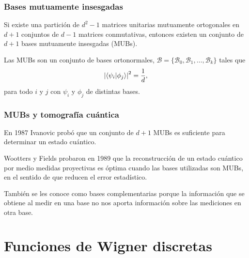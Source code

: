 \documentclass[10pt,spanish]{beamer}
\begin{document}
  \begin{frame}
    \frametitle{Bases mutuamente insesgadas}

    \begin{theorem}[Bandyophyay et al]
      Si existe una partición de $d^2-1$ matrices unitarias
      mutuamente ortogonales en $d+1$ conjuntos de $d-1$ 
      matrices conmutativas, entonces existen un conjunto de
      $d+1$ bases mutuamente insesgadas (MUBs).
    \end{theorem} 

    \pause

    \begin{definition}
      Las MUBs son un conjunto de bases ortonormales,
      $\mathcal B = \{\mathcal B_0, \mathcal
      B_1,\ldots,\mathcal B_k\}$ tales que 
      \begin{equation}
        \left|\braket{\psi_i|\phi_j}\right|^2
        = \frac{1}{d},
      \end{equation}
      para todo $i$ y $j$ con $\psi_i$ y $\phi_j$ de distintas
      bases.
    \end{definition}
  \end{frame}

  \begin{frame}
    \frametitle{MUBs y tomografía cuántica}

    En 1987 Ivanovic probó que un conjunto de $d+1$ MUBs es
    suficiente para determinar un estado cuántico.

    \vspace{15pt}

    \pause

    Wootters y Fields probaron en 1989 que la reconstrucción
    de un estado cuántico por medio medidas proyectivas es
    óptima cuando las bases utilizadas son MUBs, en el
    sentido de que reducen el error estadístico.

    \vspace{15pt}

    \pause

    También se les conoce como bases complementarias porque
    la información que se obtiene al medir en una base no
    nos aporta información sobre las mediciones en otra
    base.
  \end{frame}

  \section{Funciones de Wigner discretas}
\end{document}
